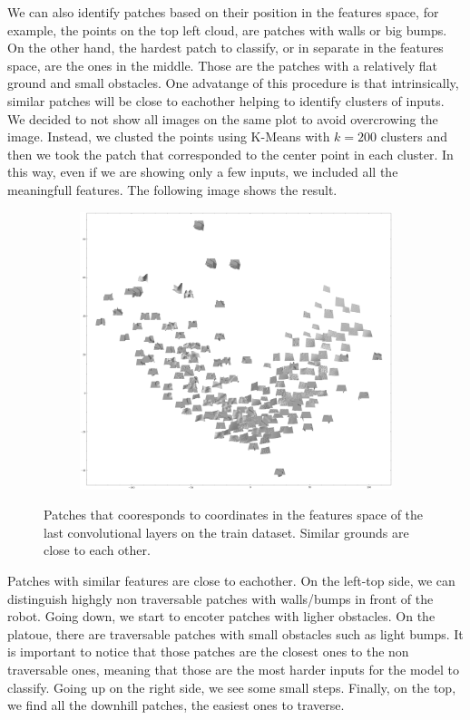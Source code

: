 \documentclass[../document.tex]{subfiles}
\begin{document}
We can also identify patches based on their position in the features space, for example, the points on the top left cloud, are patches with walls or big bumps. On the other hand, the hardest patch to classify, or in separate in the features space, are the ones in the middle. Those are the patches with a relatively flat ground and small obstacles. One advatange of this procedure is that intrinsically, similar patches will be close to eachother helping to identify clusters of inputs. We decided to not show all images on the same plot to avoid overcrowing the image. Instead, we clusted the points using K-Means with $k=200$ clusters and then we took the patch that corresponded to the center point in each cluster. In this way, even if we are showing only a few inputs, we included all the meaningfull features. The following image shows the result. 
\begin{figure}[H]
    \centering
    \begin{subfigure}[b]{1\textwidth}
        \includegraphics[width=\linewidth]{../img/5/pca/pca-patches-200.png}
    \end{subfigure}
    \caption{Patches that cooresponds to coordinates in the features space of the last convolutional layers on the train dataset. Similar grounds are close to each other.}
\end{figure}
Patches with similar features are close to eachother. On the left-top side, we can distinguish highgly non traversable patches with walls/bumps in front of the robot. Going down, we start to encoter patches with ligher obstacles. On the platoue, there are traversable patches with small obstacles such as light bumps. It is important to notice that those patches are the closest ones to the non traversable ones, meaning that those are the most harder inputs for the model to classify. Going up on the right side, we see some small steps. Finally, on the top, we find all the downhill patches, the easiest ones to traverse.
\end{document}
